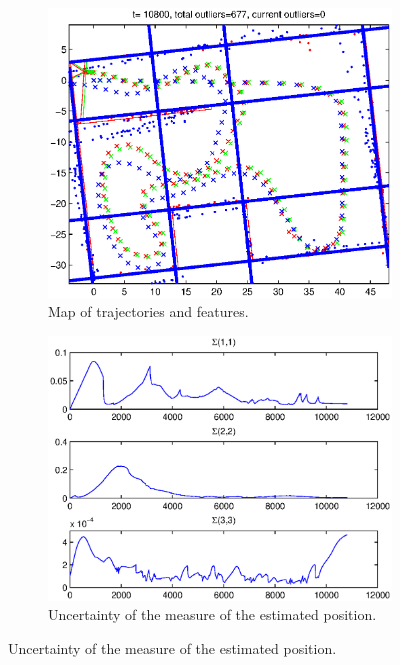 \documentclass[a4paper,12pt]{article}
\begin{document}
\begin{figure}
        \begin{subfigure}[t]{0.45\textwidth}
                \includegraphics[width=\textwidth]{noerr_map2}
                \caption{Map of trajectories and features.}
                \label{fig:noerr_map}
        \end{subfigure}%
        \begin{subfigure}[t]{0.45\textwidth}
                \includegraphics[width=\textwidth]{noerr_sig}
                \caption{Uncertainty of the measure of the estimated position.}
                \label{fig:noerr_sig}
        \end{subfigure}
        

\end{figure}
\end{document}
